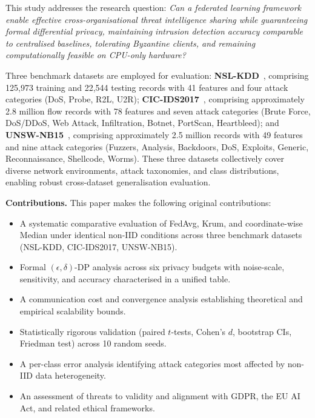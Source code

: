 \documentclass[conference]{IEEEtran}
\begin{document}
This study addresses the research question:
\textit{Can a federated learning framework enable effective
cross-organisational threat intelligence sharing while guaranteeing
formal differential privacy, maintaining intrusion detection accuracy
comparable to centralised baselines, tolerating Byzantine clients,
and remaining computationally feasible on CPU-only hardware?}

Three benchmark datasets are employed for evaluation:
\textbf{NSL-KDD}~\cite{tavallaee2009}, comprising 125,973 training and 22,544
testing records with 41 features and four attack categories (DoS, Probe, R2L, U2R);
\textbf{CIC-IDS2017}~\cite{sharafaldin2018}, comprising approximately 2.8 million flow records with
78 features and seven attack categories (Brute Force, DoS/DDoS, Web Attack,
Infiltration, Botnet, PortScan, Heartbleed);
and \textbf{UNSW-NB15}~\cite{moustafa2015}, comprising approximately 2.5 million records with
49 features and nine attack categories (Fuzzers, Analysis, Backdoors, DoS,
Exploits, Generic, Reconnaissance, Shellcode, Worms).
These three datasets collectively cover diverse network environments,
attack taxonomies, and class distributions, enabling robust cross-dataset
generalisation evaluation.

\textbf{Contributions.}
This paper makes the following original contributions:
\begin{itemize}
  \item A systematic comparative evaluation of FedAvg, Krum, and
    coordinate-wise Median under identical non-IID conditions across
    three benchmark datasets (NSL-KDD, CIC-IDS2017, UNSW-NB15).
  \item Formal $(\epsilon,\delta)$-DP analysis across six privacy
    budgets with noise-scale, sensitivity, and accuracy characterised
    in a unified table.
  \item A communication cost and convergence analysis establishing
    theoretical and empirical scalability bounds.
  \item Statistically rigorous validation (paired $t$-tests, Cohen's
    $d$, bootstrap CIs, Friedman test) across 10 random seeds.
  \item A per-class error analysis identifying attack categories most
    affected by non-IID data heterogeneity.
  \item An assessment of threats to validity and alignment with GDPR,
    the EU AI Act, and related ethical frameworks.
\end{itemize}

\end{document}

